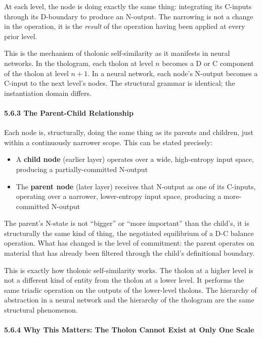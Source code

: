 \documentclass[12pt]{article}
\providecommand{\tightlist}{%
  \setlength{\itemsep}{0pt}\setlength{\parskip}{0pt}}
\begin{document}
At each level, the node is doing exactly the same thing: integrating its
C-inputs through its D-boundary to produce an N-output. The narrowing is
not a change in the operation, it is the \emph{result} of the operation
having been applied at every prior level.

This is the mechanism of tholonic self-similarity as it manifests in
neural networks. In the thologram, each tholon at level \(n\) becomes a
D or C component of the tholon at level \(n+1\). In a neural network,
each node's N-output becomes a C-input to the next level's nodes. The
structural grammar is identical; the instantiation domain differs.

\paragraph{5.6.3 The Parent-Child
Relationship}\label{the-parent-child-relationship}

Each node is, structurally, doing the same thing as its parents and
children, just within a continuously narrower scope. This can be stated
precisely:

\begin{itemize}
\tightlist
\item
  A \textbf{child node} (earlier layer) operates over a wide,
  high-entropy input space, producing a partially-committed N-output
\item
  The \textbf{parent node} (later layer) receives that N-output as one
  of its C-inputs, operating over a narrower, lower-entropy input space,
  producing a more-committed N-output
\end{itemize}

The parent's N-state is not ``bigger'' or ``more important'' than the
child's, it is structurally the same kind of thing, the negotiated
equilibrium of a D-C balance operation. What has changed is the level of
commitment: the parent operates on material that has already been
filtered through the child's definitional boundary.

This is exactly how tholonic self-similarity works. The tholon at a
higher level is not a different kind of entity from the tholon at a
lower level. It performs the same triadic operation on the outputs of
the lower-level tholons. The hierarchy of abstraction in a neural
network and the hierarchy of the thologram are the same structural
phenomenon.

\paragraph{5.6.4 Why This Matters: The Tholon Cannot Exist at Only One
Scale}\label{why-this-matters-the-tholon-cannot-exist-at-only-one-scale}
\end{document}
